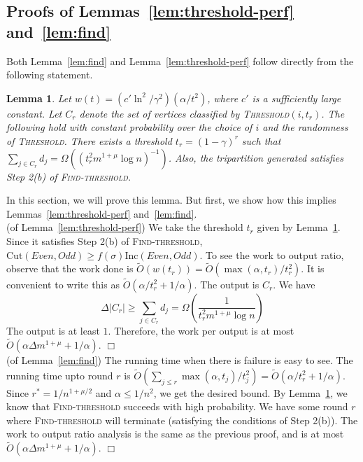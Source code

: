 \documentclass[11pt]{article}
\newtheorem{Lem}[theorem]{Lemma}
\newenvironment{myproof}{\noindent {\sc Proof:}}{$\Box$}
\newcommand\inc{\textrm{Inc}}
\newcommand\cut{\textrm{Cut}}
\newcommand\Threshold{\textsc{Threshold}\xspace}
\newcommand\Find{\textsc{Find-threshold}\xspace}
\newcommand\otilde{\widetilde{O}}
\begin{document}
\subsection{Proofs of Lemmas~\ref{lem:threshold-perf} and~\ref{lem:find}} \label{sec:thresh}

Both Lemma~\ref{lem:find} and
Lemma~\ref{lem:threshold-perf} follow directly
from the following statement.

\begin{Lem} \label{lem:good-thresh} Let $w(t) = (c'\ln^2/\gamma^2)(\alpha/t^2)$, where
$c'$ is a sufficiently large constant. Let $C_r$ denote the set of vertices
classified by \Threshold$(i,t_r)$.
The following hold with constant probability
over the choice of $i$ and the randomness of {\Threshold}.
There exists a threshold $t_r = (1-\gamma)^r$ such
that $\sum_{j \in C_r} d_j = \Omega((t_r^2m^{1+\mu}\log n)^{-1})$.
Also, the tripartition generated satisfies Step 2(b) of {\Find}.
\end{Lem}

In this section, we will prove this lemma. But first,
we show how this implies Lemmas~\ref{lem:threshold-perf}
and~\ref{lem:find}.\\

\begin{myproof} (of Lemma~\ref{lem:threshold-perf}) We take
the threshold $t_r$ given by Lemma~\ref{lem:good-thresh}.
Since it satisfies Step 2(b) of {\Find},
$\cut(Even,Odd) \geq f(\sigma)\inc(Even,Odd)$. To see the work
to output ratio, observe that the work done is $\otilde(w(t_r))
= \otilde(\max(\alpha,t_r)/t_r^2)$. It is convenient
to write this as $\otilde(\alpha/t_r^2 + 1/\alpha)$.
The output is $C_r$. We have
$$ \Delta |C_r| \geq \sum_{j \in C_r} d_j = \Omega(\frac{1}{t_r^2m^{1+\mu}\log n}) $$
The output is at least $1$. Therefore, the work per
output is at most $\otilde(\alpha \Delta m^{1+\mu} + 1/\alpha)$.
\end{myproof}\\

\begin{myproof} (of Lemma~\ref{lem:find}) The running time when there
is failure is easy to see. The running time upto round $r$
is $\otilde(\sum_{j \leq r} \max(\alpha,t_j)/t_j^2) = \otilde(\alpha/t_r^2 + 1/\alpha)$.
Since $r^* = 1/n^{1+\mu/2}$ and $\alpha \leq 1/n^2$, we get the desired bound.
By Lemma~\ref{lem:good-thresh}, we know that {\Find} succeeds with high probability.
We have some round $r$ where {\Find} will
terminate (satisfying the conditions of Step 2(b)).
The work to output ratio analysis is the same as the previous
proof, and is at most $\otilde(\alpha \Delta m^{1+\mu} + 1/\alpha)$.
\end{myproof}\\
\end{document}
